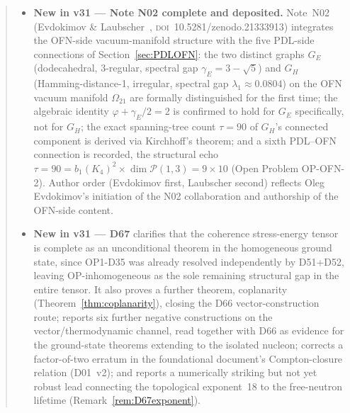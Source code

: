 \documentclass[11pt,a4paper]{article}
\theoremstyle{plain}
\theoremstyle{definition}
\theoremstyle{remark}
\newcommand{\Kfour}{K_4}
\begin{document}
\begin{abstract}
\begin{itemize}
\item \textbf{New in v31 --- Note N02 complete and deposited.} Note~N02 (Evdokimov \& Laubscher~\cite{N02}, \textsc{doi}~10.5281/zenodo.21333913) integrates the OFN-side vacuum-manifold structure with the five PDL-side connections of Section~\ref{sec:PDLOFN}: the two distinct graphs $G_E$ (dodecahedral, 3-regular, spectral gap $\gamma_E=3-\sqrt5$) and $G_H$ (Hamming-distance-1, irregular, spectral gap $\lambda_1\approx0.0804$) on the OFN vacuum manifold $\Omega_{21}$ are formally distinguished for the first time; the algebraic identity $\varphi+\gamma_E/2=2$ is confirmed to hold for $G_E$ specifically, not for $G_H$; the exact spanning-tree count $\tau=90$ of $G_H$'s connected component is derived via Kirchhoff's theorem; and a sixth PDL--OFN connection is recorded, the structural echo $\tau=90=b_1(\Kfour)^2\times\dim\mathcal P(1,3)=9\times10$ (Open Problem OP-OFN-2). Author order (Evdokimov first, Laubscher second) reflects Oleg Evdokimov's initiation of the N02 collaboration and authorship of the OFN-side content.
\item \textbf{New in v31 --- D67} clarifies that the coherence stress-energy tensor is complete as an unconditional theorem in the homogeneous ground state, since OP1-D35 was already resolved independently by D51+D52, leaving OP-inhomogeneous as the sole remaining structural gap in the entire tensor. It also proves a further theorem, coplanarity (Theorem~\ref{thm:coplanarity}), closing the D66 vector-construction route; reports six further negative constructions on the vector/thermodynamic channel, read together with D66 as evidence for the ground-state theorems extending to the isolated nucleon; corrects a factor-of-two erratum in the foundational document's Compton-closure relation (D01~v2); and reports a numerically striking but not yet robust lead connecting the topological exponent~18 to the free-neutron lifetime (Remark~\ref{rem:D67exponent}).
\end{itemize}

\end{abstract}
\end{document}

